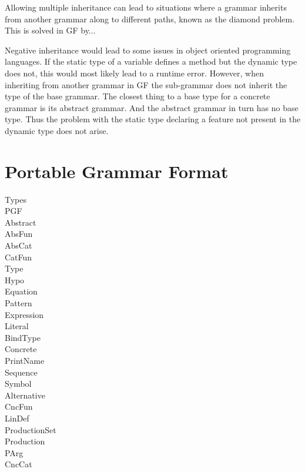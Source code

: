 Allowing multiple inheritance can lead to situations where a grammar inherits from another grammar along to different paths, known as the diamond problem. This is solved in GF by...

Negative inheritance would lead to some issues in object oriented programming languages. If the static type of a variable defines a method but the dynamic type does not, this would most likely lead to a runtime error. However, when inheriting from another grammar in GF the sub-grammar does not inherit the type of the base grammar. The closest thing to a base type for a concrete grammar is its abstract grammar. And the abstract grammar in turn has no base type. Thus the problem with the static type declaring a feature not present in the dynamic type does not arise.

\section{Portable Grammar Format}
\begin{description}
\item[Types]
\item[PGF]
\item[Abstract]
\item[AbsFun]
\item[AbsCat]
\item[CatFun]
\item[Type]
\item[Hypo]
\item[Equation]
\item[Pattern]
\item[Expression]
\item[Literal]
\item[BindType]
\item[Concrete]
\item[PrintName]
\item[Sequence]
\item[Symbol]
\item[Alternative]
\item[CncFun]
\item[LinDef]
\item[ProductionSet]
\item[Production]
\item[PArg]
\item[CncCat]
\end{description}
